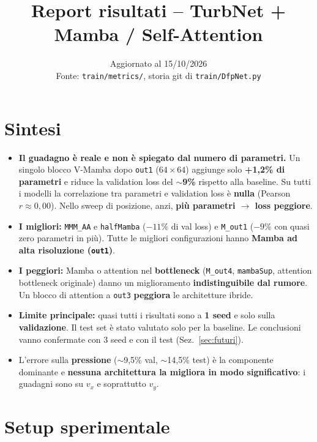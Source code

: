 \documentclass[11pt,a4paper]{article}
\title{Report risultati -- TurbNet + Mamba / Self-Attention}
\author{}
\date{Aggiornato al 15/10/2026 \\ \small Fonte: \texttt{train/metrics/}, storia git di \texttt{train/DfpNet.py}}
\newcommand{\cfg}[1]{\texttt{#1}}
\begin{document}
\maketitle

\section*{Sintesi}

\begin{itemize}
  \item \textbf{Il guadagno è reale e non è spiegato dal numero di parametri.} Un singolo blocco V-Mamba dopo \cfg{out1} ($64\times64$) aggiunge solo \textbf{+1,2\% di parametri} e riduce la validation loss del \textbf{$\sim$9\%} rispetto alla baseline. Su tutti i modelli la correlazione tra parametri e validation loss è \textbf{nulla} (Pearson $r \approx 0{,}00$). Nello sweep di posizione, anzi, \textbf{più parametri $\rightarrow$ loss peggiore}.
  \item \textbf{I migliori:} \cfg{MMM\_AA} e \cfg{halfMamba} ($-11\%$ di val loss) e \cfg{M\_out1} ($-9\%$ con quasi zero parametri in più). Tutte le migliori configurazioni hanno \textbf{Mamba ad alta risoluzione (\cfg{out1})}.
  \item \textbf{I peggiori:} Mamba o attention nel \textbf{bottleneck} (\cfg{M\_out4}, \cfg{mambaSup}, attention bottleneck originale) danno un miglioramento \textbf{indistinguibile dal rumore}. Un blocco di attention a \cfg{out3} \textbf{peggiora} le architetture ibride.
  \item \textbf{Limite principale:} quasi tutti i risultati sono a \textbf{1 seed} e solo sulla \textbf{validazione}. Il test set è stato valutato solo per la baseline. Le conclusioni vanno confermate con 3 seed e con il test (Sez.~\ref{sec:futuri}).
  \item L'errore sulla \textbf{pressione} ($\sim$9,5\% val, $\sim$14,5\% test) è la componente dominante e \textbf{nessuna architettura la migliora in modo significativo}: i guadagni sono su $v_x$ e soprattutto $v_y$.
\end{itemize}

\section{Setup sperimentale}
\end{document}
